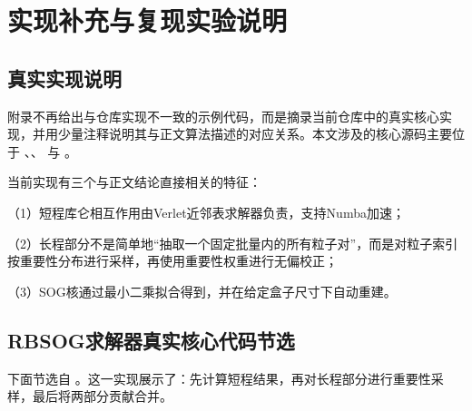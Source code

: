 \chapter{实现补充与复现实验说明}\label{appendix:code}

\section{真实实现说明}

附录不再给出与仓库实现不一致的示例代码，而是摘录当前仓库中的真实核心实现，并用少量注释说明其与正文算法描述的对应关系。本文涉及的核心源码主要位于 、、 与 。

当前实现有三个与正文结论直接相关的特征：

（1）短程库仑相互作用由Verlet近邻表求解器负责，支持Numba加速；

（2）长程部分不是简单地“抽取一个固定批量内的所有粒子对”，而是对粒子索引按重要性分布进行采样，再使用重要性权重进行无偏校正；

（3）SOG核通过最小二乘拟合得到，并在给定盒子尺寸下自动重建。

\section{RBSOG求解器真实核心代码节选}

下面节选自 。这一实现展示了：先计算短程结果，再对长程部分进行重要性采样，最后将两部分贡献合并。

